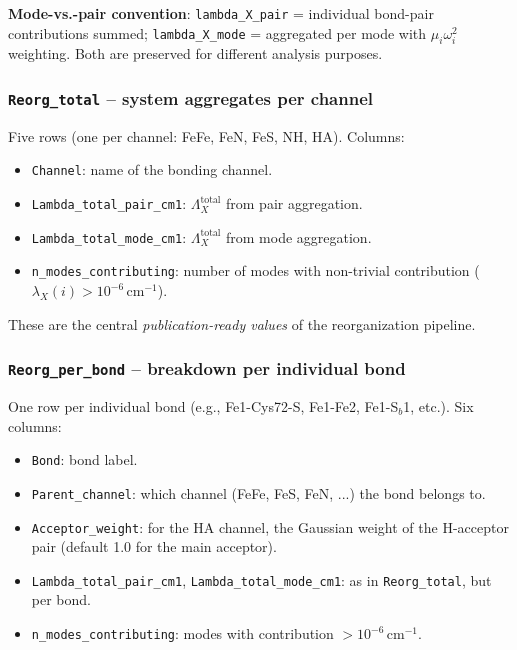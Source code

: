 \documentclass[11pt,a4paper,twoside]{article}
\theoremstyle{remark}
\begin{document}
\textbf{Mode-vs.-pair convention}: \texttt{lambda\_X\_pair} =
individual bond-pair contributions summed; \texttt{lambda\_X\_mode}
= aggregated per mode with $\mu_i\omega_i^2$ weighting. Both are
preserved for different analysis purposes.

\subsubsection*{\texttt{Reorg\_total} -- system aggregates per channel}

Five rows (one per channel: FeFe, FeN, FeS, NH, HA). Columns:

\begin{itemize}\setlength{\itemsep}{0pt}
  \item \texttt{Channel}: name of the bonding channel.
  \item \texttt{Lambda\_total\_pair\_cm1}: $\Lambda_X^\text{total}$
        from pair aggregation.
  \item \texttt{Lambda\_total\_mode\_cm1}: $\Lambda_X^\text{total}$
        from mode aggregation.
  \item \texttt{n\_modes\_contributing}: number of modes with
        non-trivial contribution
        ($\lambda_X(i) > 10^{-6}$\,cm$^{-1}$).
\end{itemize}

These are the central \emph{publication-ready values} of the
reorganization pipeline.

\subsubsection*{\texttt{Reorg\_per\_bond} -- breakdown per individual bond}

One row per individual bond (e.g., Fe1-Cys72-S, Fe1-Fe2,
Fe1-S$_b$1, etc.). Six columns:

\begin{itemize}\setlength{\itemsep}{0pt}
  \item \texttt{Bond}: bond label.
  \item \texttt{Parent\_channel}: which channel
        (FeFe, FeS, FeN, ...) the bond belongs to.
  \item \texttt{Acceptor\_weight}: for the HA channel, the
        Gaussian weight of the H-acceptor pair (default 1.0 for
        the main acceptor).
  \item \texttt{Lambda\_total\_pair\_cm1},
        \texttt{Lambda\_total\_mode\_cm1}: as in
        \texttt{Reorg\_total}, but per bond.
  \item \texttt{n\_modes\_contributing}: modes with contribution
        $> 10^{-6}$\,cm$^{-1}$.
\end{itemize}
\end{document}

